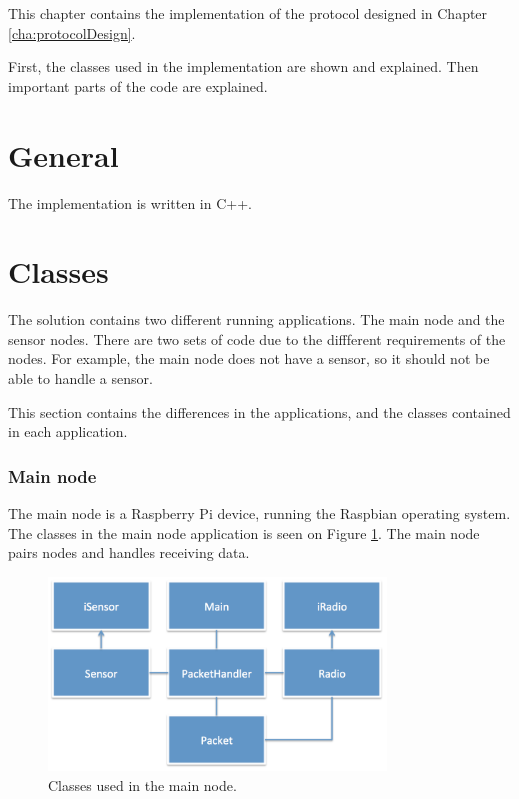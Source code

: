 This chapter contains the implementation of the protocol designed in Chapter \ref{cha:protocolDesign}. 

First, the classes used in the implementation are shown and explained. Then important parts of the code are explained.
 

\section{General}
The implementation is written in C++.

\section{Classes}
The solution contains two different running applications. The main node and the sensor nodes. There are two sets of code due to the diffferent requirements of the nodes. For example, the main node does not have a sensor, so it should not be able to handle a sensor.

This section contains the differences in the applications, and the classes contained in each application.

\subsubsection*{Main node}
The main node is a Raspberry Pi device, running the Raspbian operating system. The classes in the main node application is seen on Figure \ref{fig:mainnodeClass}.
The main node pairs nodes and handles receiving data.

\begin{figure}[h!]
\centering
\includegraphics[width=0.8\textwidth]{chapters/implementation/figures/mainnodeClass.png}
\caption{Classes used in the main node.}
\label{fig:mainnodeClass}
\end{figure}



